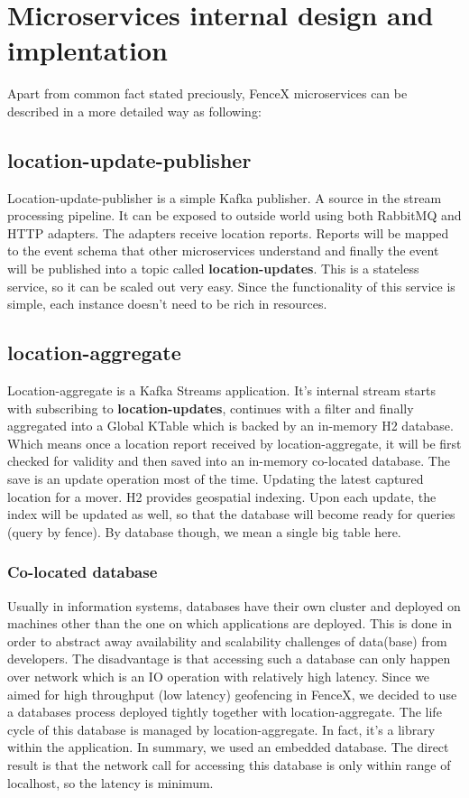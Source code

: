 \documentclass[a4]{report}
\begin{document}
    \section{Microservices internal design and implentation}
    Apart from common fact stated preciously, FenceX microservices can be described in a more detailed way as following:

    \subsection{location-update-publisher}
    Location-update-publisher is a simple Kafka publisher.
    A source in the stream processing pipeline.
    It can be exposed to outside world using both RabbitMQ and HTTP adapters.
    The adapters receive location reports.
    Reports will be mapped to the event schema that other microservices
    understand and finally the event will be published into a topic called \textbf{location-updates}.
    This is a stateless service, so it can be scaled out very easy.
    Since the functionality of this service is simple, each instance doesn't need to be rich in resources.

    \subsection{location-aggregate}
    Location-aggregate is a Kafka Streams application.
    It's internal stream starts with subscribing to \textbf{location-updates}, continues with a filter and finally
    aggregated into a Global KTable which is backed by an in-memory H2 database.
    Which means once a location report received by location-aggregate, it will be first checked for validity and then
    saved into an in-memory co-located database.
    The save is an update operation most of the time.
    Updating the latest captured location for a mover.
    H2 provides geospatial indexing.
    Upon each update, the index will be updated as well, so that the database will become ready for queries (query by
    fence).
    By database though, we mean a single big table here.

    \subsubsection{Co-located database}
    Usually in information systems, databases have their own cluster and deployed on machines other than the one on
    which applications are deployed.
    This is done in order to abstract away availability and scalability challenges of data(base) from developers.
    The disadvantage is that accessing such a database can only happen over network which is an IO operation with
    relatively high latency.
    Since we aimed for high throughput (low latency) geofencing in FenceX, we decided to use a databases process
    deployed tightly together with location-aggregate.
    The life cycle of this database is managed by location-aggregate.
    In fact, it's a library within the application.
    In summary, we used an embedded database.
    The direct result is that the network call for accessing this database is only within range of localhost, so the
    latency is minimum.
\end{document}

